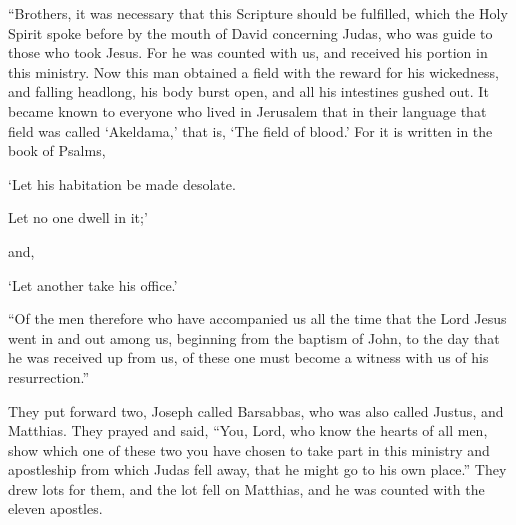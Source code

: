 {“Brothers, it was necessary that this Scripture should be fulfilled, which the Holy Spirit spoke before by the mouth of David concerning Judas, who was guide to those who took Jesus.
For he was counted with us, and received his portion in this ministry.
Now this man obtained a field with the reward for his wickedness, and falling headlong, his body burst open, and all his intestines gushed out.
It became known to everyone who lived in Jerusalem that in their language that field was called ‘Akeldama,’ that is, ‘The field of blood.’
For it is written in the book of Psalms,
\par }{\Q ‘Let his habitation be made desolate.
\par }{\QB Let no one dwell in it;’
\par }{\PP and,
\par }{\Q ‘Let another take his office.’
\par }{\PP {}“Of the men therefore who have accompanied us all the time that the Lord Jesus went in and out among us,
beginning from the baptism of John, to the day that he was received up from us, of these one must become a witness with us of his resurrection.”
\par }{\PP {}They put forward two, Joseph called Barsabbas, who was also called Justus, and Matthias.
They prayed and said, “You, Lord, who know the hearts of all men, show which one of these two you have chosen
to take part in this ministry and apostleship from which Judas fell away, that he might go to his own place.”
They drew lots for them, and the lot fell on Matthias, and he was counted with the eleven apostles.

}
